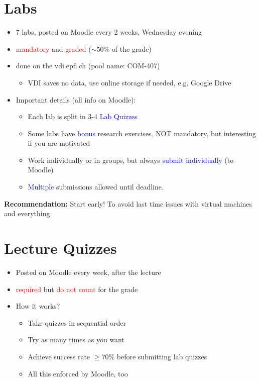 \documentclass[11pt]{article}
\begin{document}
\section*{Labs}
\begin{itemize}
	\item 7 labs, posted on Moodle every 2 weeks, Wednesday evening
	\item \textcolor{red}{mandatory} and \textcolor{red}{graded} ($\sim$50\% of the grade)
	\item done on the vdi.epfl.ch (pool name: COM-407)
	\begin{itemize}
		\item VDI saves no data, use online storage if needed, e.g. Google Drive
	\end{itemize}
\end{itemize}

\begin{itemize}
	\item Important details (all info on Moodle): 
	\begin{itemize}
		\item Each lab is split in 3-4 \textcolor{blue}{Lab Quizzes} 
		\item Some labs have \textcolor{blue}{bonus} research exercises, NOT mandatory, but interesting if you are motivated
		\item Work individually or in groups, but always \textcolor{blue}{submit individually} (to Moodle)
		\item \textcolor{blue}{Multiple} submissions allowed until deadline.
	\end{itemize}
\end{itemize}

\textbf{Recommendation:} Start early! To avoid last time issues with virtual machines and everything.

\section*{Lecture Quizzes}
\begin{itemize}
	\item Posted on Moodle every week, after the lecture
	\item \textcolor{red}{required} but \textcolor{red}{do not count} for the grade
\end{itemize}

\begin{itemize}
	\item How it works?
	\begin{itemize}
		\item Take quizzes in sequential order
		\item Try as many times as you want
		\item Achieve success rate $\ge 70\%$ before submitting lab quizzes
		\item All this enforced by Moodle, too
	\end{itemize}
\end{itemize}
\end{document}

